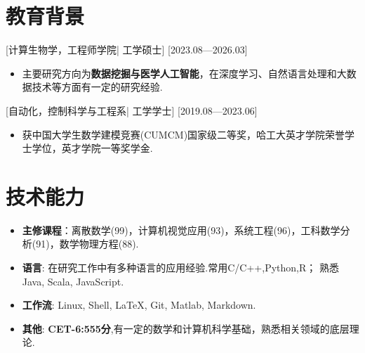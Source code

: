 \documentclass{resume}
\begin{document}


\ResumeTitle

\vspace{0.5cm}
\section{\textbf{教育背景}}
[\textnormal{计算生物学，工程师学院|} 工学硕士]
[2023.08—2026.03]
\begin{itemize}
    \item 主要研究方向为\textbf{数据挖掘与医学人工智能}，在深度学习、自然语言处理和大数据技术等方面有一定的研究经验.
\end{itemize}

[\textnormal{自动化，控制科学与工程系|} 工学学士]
[2019.08—2023.06]
\begin{itemize}
    \item 获中国大学生数学建模竞赛(CUMCM)国家级二等奖，哈工大英才学院荣誉学士学位，英才学院一等奖学金.
\end{itemize}


\section[技术能力]{\textbf{技术能力}}
\begin{itemize}
\item \textbf{主修课程}：离散数学(99)，计算机视觉应用(93)，系统工程(96)，工科数学分析(91)，数学物理方程(88).
  \item \textbf{语言}: 在研究工作中有多种语言的应用经验.常用C/C++,Python,R； 熟悉 Java, Scala, JavaScript.
  \item \textbf{工作流}: Linux, Shell, LaTeX, Git, Matlab, Markdown.
  \item \textbf{其他}: \textbf{CET-6:555分},有一定的数学和计算机科学基础，熟悉相关领域的底层理论.
\end{itemize}
\end{document}
